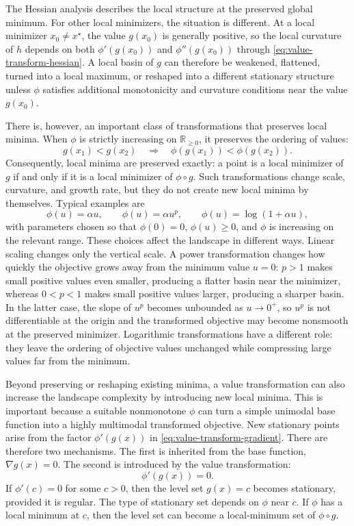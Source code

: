 \documentclass[journal]{IEEEtran}
\theoremstyle{remark}
\theoremstyle{plain}
\begin{document}
The Hessian analysis describes the local structure at the preserved global
minimum. For other local minimizers, the situation is different. At a local
minimizer \(x_0\ne x^\star\), the value \(g(x_0)\) is generally positive, so
the local curvature of \(h\) depends on both \(\phi'(g(x_0))\) and
\(\phi''(g(x_0))\) through \eqref{eq:value-transform-hessian}. A local basin of
\(g\) can therefore be weakened, flattened, turned into a local maximum, or
reshaped into a different stationary structure unless \(\phi\) satisfies
additional monotonicity and curvature conditions near the value \(g(x_0)\).

There is, however, an important class of transformations that preserves local
minima. When \(\phi\) is strictly increasing on \(\mathbb{R}_{\ge0}\), it preserves the
ordering of values:
\[
	g(x_1)<g(x_2)
	\quad\Longrightarrow\quad
	\phi(g(x_1))<\phi(g(x_2)).
\]
Consequently, local minima are preserved exactly: a point is a local minimizer
of \(g\) if and only if it is a local minimizer of \(\phi\circ g\). Such
transformations change scale, curvature, and growth rate, but they do not create
new local minima by themselves. Typical examples are
\[
	\phi(u)=\alpha u,
	\qquad
	\phi(u)=\alpha u^p,
	\qquad
	\phi(u)=\log(1+\alpha u),
\]
with parameters chosen so that \(\phi(0)=0\), \(\phi(u)\ge0\), and \(\phi\) is
increasing on the relevant range. These choices affect the landscape in
different ways. Linear scaling changes only the vertical scale. A power
transformation changes how quickly the objective grows away from the minimum
value \(u=0\): \(p>1\) makes small positive values even smaller, producing a
flatter basin near the minimizer, whereas \(0<p<1\) makes small positive values
larger, producing a sharper basin. In the latter case, the slope of \(u^p\)
becomes unbounded as \(u\to0^+\), so \(u^p\) is not differentiable at the origin
and the transformed objective may become nonsmooth at the preserved minimizer.
Logarithmic transformations have a different role: they leave the ordering of
objective values unchanged while compressing large values far from the
minimum.


Beyond preserving or reshaping existing minima, a value transformation can also
increase the landscape complexity by introducing new local minima. This is
important because a suitable nonmonotone \(\phi\) can turn a simple unimodal
base function into a highly multimodal transformed objective. New stationary
points arise from the factor \(\phi'(g(x))\) in
\eqref{eq:value-transform-gradient}. There are therefore two mechanisms. The first is inherited from the base
function, \(\nabla g(x)=0\). The second is introduced by the value
transformation:
\begin{equation}
	\phi'(g(x))=0.
	\label{eq:value-transform-new-stationary}
\end{equation}
If \(\phi'(c)=0\) for some \(c>0\), then the level set \(g(x)=c\) becomes
stationary, provided it is regular. The type of stationary set depends on
\(\phi\) near \(c\). If \(\phi\) has a local minimum at \(c\), then the level set
can become a local-minimum set of \(\phi\circ g\).
\end{document}
